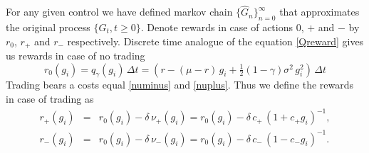 For any given control we have defined markov chain $\{\widehat{G}_n\}_{n=0}^{\infty}$ that approximates the original process $\{G_t,t\geq0\}$. 
Denote rewards in case of actions $0$, $+$ and $-$ by $r_0$, $r_+$ and $r_-$ respectively. Discrete time analogue of  the equation \eqref{Qreward} gives us rewards in case of no trading
\begin{equation*}
r_0(g_i)=q_\gamma(g_i)\,\Delta t =(r-(\mu-r)\,g_i+\tfrac{1}{2}(1-\gamma)\sigma^2\,g_i^2)\,\Delta t
\end{equation*}
Trading bears a costs equal \eqref{numinus} and \eqref{nuplus}. Thus we define the rewards in case of trading as
\begin{eqnarray*}
r_+(g_i)&=&r_0(g_i)-\delta\,\nu_{+}(g_i)=r_0(g_i)-\delta\,c_{+}\,(1+c_{+} g_i)^{-1},\\	
r_-(g_i)&=&r_0(g_i)-\delta\,\nu_{-}(g_i)=r_0(g_i)-\delta\,c_{-}\,(1-c_{-} g_i)^{-1}.	 
\end{eqnarray*}

